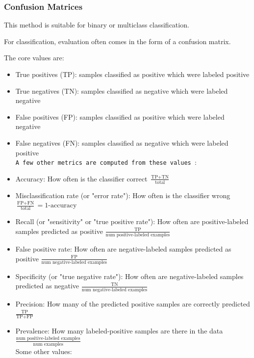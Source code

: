\subsubsection{Confusion Matrices}
This method is suitable for binary or multiclass classification.

For classification, evaluation often comes in the form of a confusion matrix.

The core values are:
\begin{itemize}
\item True positives (TP): samples classified as positive which were labeled positive
\item True negatives (TN): samples classified as negative which were labeled negative
\item False positives (FP): samples classified as positive which were labeled negative
\item False negatives (FN): samples classified as negative which were labeled positive\\

\texttt{A few other metrics are computed from these values }:\\

\item Accuracy: How often is the classifier correct  $\frac{\text{TP} + \text{TN}}{\text{total}}$

\item Misclassification rate (or "error rate"): How often is the classifier wrong $\frac{\text{FP} + \text{FN}}{\text{total}} = 1 $-$ \text{accuracy}$

\item Recall (or "sensitivity" or "true positive rate"): How often are positive-labeled samples predicted as positive $\frac{\text{TP}}{\text{num positive-labeled examples}}$

\item False positive rate: How often are negative-labeled samples predicted as positive  $\frac{\text{FP}}{\text{num negative-labeled examples}}$

\item Specificity (or "true negative rate"): How often are negative-labeled samples predicted as negative  $\frac{\text{TN}}{\text{num negative-labeled examples}}$
\item Precision: How many of the predicted positive samples are correctly predicted   $\frac{\text{TP}}{\text{TP} + \text{FP}}$

\item Prevalence: How many labeled-positive samples are there in the data  $\frac{\text{num positive-labeled examples}}{\text{num examples}}$ \\
Some other values:\\


\end{itemize}

